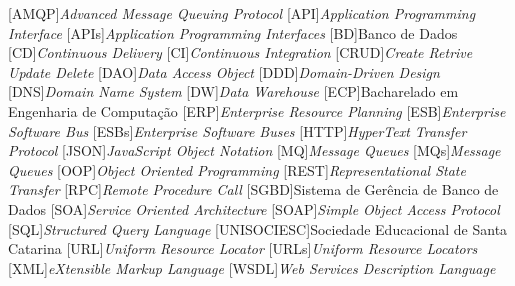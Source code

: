 
[AMQP]{\emph{Advanced Message Queuing Protocol}}
[API]{\emph{Application Programming Interface}}
[APIs]{\emph{Application Programming Interfaces}}
[BD]{Banco de Dados}
[CD]{\emph{Continuous Delivery}}
[CI]{\emph{Continuous Integration}}
[CRUD]{\emph{Create Retrive Update Delete}}
[DAO]{\emph{Data Access Object}}
[DDD]{\emph{Domain-Driven Design}}
[DNS]{\emph{Domain Name System}}
[DW]{\emph{Data Warehouse}}
[ECP]{Bacharelado em Engenharia de Computação}
[ERP]{\emph{Enterprise Resource Planning}}
[ESB]{\emph{Enterprise Software Bus}}
[ESBs]{\emph{Enterprise Software Buses}}
[HTTP]{\emph{HyperText Transfer Protocol}}
[JSON]{\emph{JavaScript Object Notation}}
[MQ]{\emph{Message Queues}}
[MQs]{\emph{Message Queues}}
[OOP]{\emph{Object Oriented Programming}}
[REST]{\emph{Representational State Transfer}}
[RPC]{\emph{Remote Procedure Call}}
[SGBD]{Sistema de Gerência de Banco de Dados}
[SOA]{\emph{Service Oriented Architecture}}
[SOAP]{\emph{Simple Object Access Protocol}}
[SQL]{\emph{Structured Query Language}}
[UNISOCIESC]{Sociedade Educacional de Santa Catarina}
[URL]{\emph{Uniform Resource Locator}}
[URLs]{\emph{Uniform Resource Locators}}
[XML]{\emph{eXtensible Markup Language}}
[WSDL]{\emph{Web Services Description Language}}
